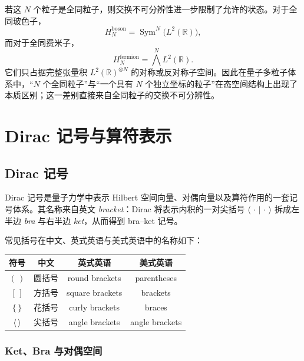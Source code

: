 \documentclass[UTF8,a4paper,11pt,openany]{ctexbook}
\begin{document}
若这 $N$ 个粒子是全同粒子，则交换不可分辨性进一步限制了允许的状态。对于全同玻色子，
\begin{equation}
    H_N^{\mathrm{boson}}
    =
    \operatorname{Sym}^N
    \bigl(
        L^2(\mathbb R)
    \bigr),
\end{equation}
而对于全同费米子，
\begin{equation}
    H_N^{\mathrm{fermion}}
    =
    \bigwedge^N
    L^2(\mathbb R).
\end{equation}
它们只占据完整张量积
$L^2(\mathbb R)^{\otimes N}$ 的对称或反对称子空间。因此在量子多粒子体系中，“$N$ 个全同粒子”与“一个具有 $N$ 个独立坐标的粒子”在态空间结构上出现了本质区别；这一差别直接来自全同粒子的交换不可分辨性。

\newpage
\chapter{Dirac 记号与算符表示}

\section{Dirac 记号}

Dirac 记号是量子力学中表示 Hilbert 空间向量、对偶向量以及算符作用的一套记号体系。其名称来自英文 \textit{bracket}：Dirac 将表示内积的一对尖括号 $\langle\,\cdot\,|\,\cdot\,\rangle$ 拆成左半边 \textit{bra} 与右半边 \textit{ket}，从而得到 bra--ket 记号。

常见括号在中文、英式英语与美式英语中的名称如下：

\begin{table}[htbp]
    \centering
    \begin{tabular}{cccc}
        \toprule
        符号 & 中文 & 英式英语 & 美式英语 \\
        \midrule
        $(\,)$ & 圆括号 & round brackets & parentheses \\
        $[\,]$ & 方括号 & square brackets & brackets \\
        $\{\,\}$ & 花括号 & curly brackets & braces \\
        $\langle\,\rangle$ & 尖括号 & angle brackets & angle brackets \\
        \bottomrule
    \end{tabular}
\end{table}

\subsection{Ket、Bra 与对偶空间}
\end{document}
